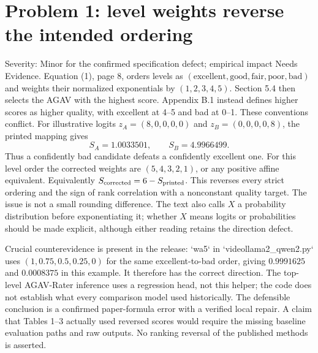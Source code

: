 \documentclass[10pt]{article}
\begin{document}
\section*{Problem 1: level weights reverse the intended ordering}
Severity: Minor for the confirmed specification defect; empirical impact Needs Evidence. Equation (1), page 8, orders levels as \((\text{excellent},\text{good},\text{fair},\text{poor},\text{bad})\) and weights their normalized exponentials by \((1,2,3,4,5)\). Section 5.4 then selects the AGAV with the highest score. Appendix B.1 instead defines higher scores as higher quality, with excellent at 4–5 and bad at 0–1. These conventions conflict. For illustrative logits \(z_A=(8,0,0,0,0)\) and \(z_B=(0,0,0,0,8)\), the printed mapping gives \[S_A=1.0033501,\qquad S_B=4.9966499.\] Thus a confidently bad candidate defeats a confidently excellent one. For this level order the corrected weights are \((5,4,3,2,1)\), or any positive affine equivalent. Equivalently \(S_{\rm corrected}=6-S_{\rm printed}\). This reverses every strict ordering and the sign of rank correlation with a nonconstant quality target. The issue is not a small rounding difference. The text also calls \(X\) a probability distribution before exponentiating it; whether \(X\) means logits or probabilities should be made explicit, although either reading retains the direction defect.\par
Crucial counterevidence is present in the release: `wa5` in `videollama2\_qwen2.py` uses \((1,0.75,0.5,0.25,0)\) for the same excellent-to-bad order, giving \(0.9991625\) and \(0.0008375\) in this example. It therefore has the correct direction. The top-level AGAV-Rater inference uses a regression head, not this helper; the code does not establish what every comparison model used historically. The defensible conclusion is a confirmed paper-formula error with a verified local repair. A claim that Tables 1–3 actually used reversed scores would require the missing baseline evaluation paths and raw outputs. No ranking reversal of the published methods is asserted.\par
\end{document}
